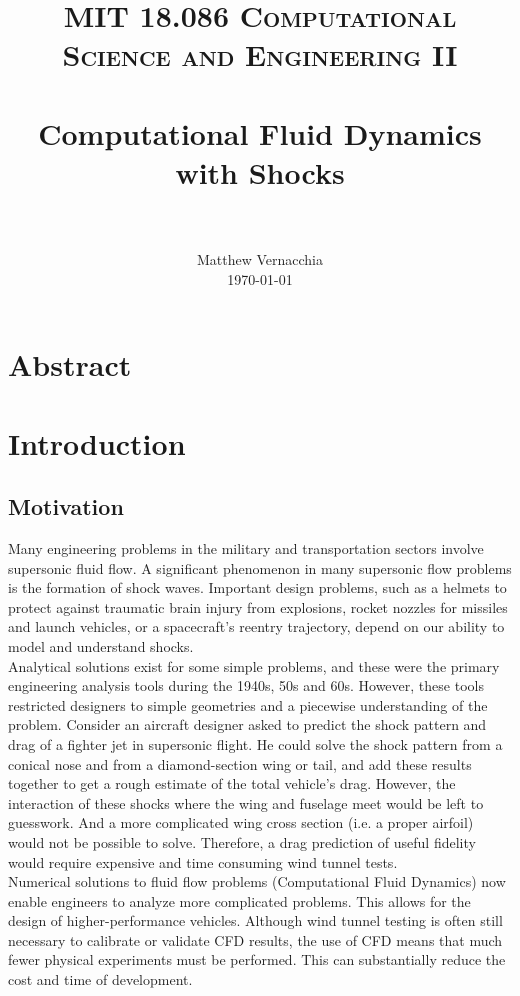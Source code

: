 \documentclass[paper=a4, fontsize=11pt]{scrartcl}
\title{
        \usefont{OT1}{bch}{b}{n}
        \normalfont \normalsize \textsc{MIT 18.086 Computational Science and Engineering II} \\ [25pt]
        \horrule{0.5pt} \\[0.4cm]
        \huge Computational Fluid Dynamics with Shocks \\
        \horrule{2pt} \\[0.5cm]
}
\author{
        \normalfont                                 \normalsize
        Matthew Vernacchia\\[-3pt]      \normalsize
        \today
}
\date{}
\numberwithin{equation}{section}        %
\numberwithin{figure}{section}          %
\numberwithin{table}{section}               %
\begin{document}
\maketitle
\section{Abstract}

\section{Introduction}
\subsection{Motivation}
Many engineering problems in the military and transportation sectors involve supersonic fluid flow. A significant phenomenon in many supersonic flow problems is the formation of shock waves. Important design problems, such as a helmets to protect against traumatic brain injury from explosions, rocket nozzles for missiles and launch vehicles, or a spacecraft's reentry trajectory, depend on our ability to model and understand shocks.\\
Analytical solutions exist for some simple problems, and these were the primary engineering analysis tools during the 1940s, 50s and 60s. However, these tools restricted designers to simple geometries and a piecewise understanding of the problem. Consider an aircraft designer asked to predict the shock pattern and drag of a fighter jet in supersonic flight. He could solve the shock pattern from a conical nose and from a diamond-section wing or tail, and add these results together to get a rough estimate of the total vehicle's drag. However, the interaction of these shocks where the wing and fuselage meet would be left to guesswork. And a more complicated wing cross section (i.e. a proper airfoil) would not be possible to solve. Therefore, a drag prediction of useful fidelity would require expensive and time consuming wind tunnel tests.\\
Numerical solutions to fluid flow problems (Computational Fluid Dynamics) now enable engineers to analyze more complicated problems. This allows for the design of higher-performance vehicles. Although wind tunnel testing is often still necessary to calibrate or validate CFD results, the use of CFD means that much fewer physical experiments must be performed. This can substantially reduce the cost and time of development.  
\end{document}
